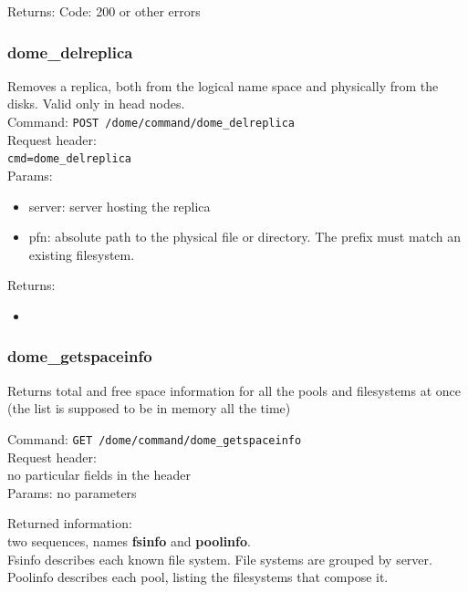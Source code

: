 \documentclass[a4paper,10pt]{scrreprt}
\begin{document}
Returns:
Code: 200 or other errors




\subsubsection{dome\_delreplica}

Removes a replica, both from the logical name space and physically from the disks. Valid only in head nodes.\\
Command:
\lstinline"POST /dome/command/dome_delreplica"\\

Request header:\\
\lstinline"cmd=dome_delreplica"\\

Params:
\begin{itemize}
 \item server: server hosting the replica
 \item pfn: absolute path to the physical file or directory. The prefix must match an existing filesystem.
\end{itemize}

Returns:
\begin{itemize}
 \item
\end{itemize}



\subsubsection{dome\_getspaceinfo}
Returns total and free space information for all the pools and filesystems at once (the list is supposed to be in memory all the time)

Command:
\lstinline"GET /dome/command/dome_getspaceinfo"\\
Request header:\\
 no particular fields in the header\\
Params:
 no parameters

Returned information:\\
two sequences, names \textbf{fsinfo} and \textbf{poolinfo}.\\
Fsinfo describes each known file system. File systems are grouped by server.\\
Poolinfo describes each pool, listing the filesystems that compose it.\\
\end{document}
